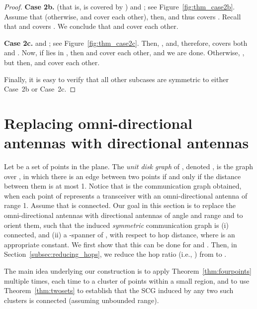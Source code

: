 \documentclass[11pt,letter]{article}
\newcommand{\old}[1]{{{}}}
\begin{document}
\begin{proof}
\noindent
{\bf Case 2b.}  (that is,  is covered by )
and ; see Figure~\ref{fig:thm_case2b}.
Assume that  (otherwise,  and  cover each other),
then,  and thus covers .
Recall that  and covers .
We conclude that  and  cover each other.


\old{
\begin{figure}[htp]
   \centering
       \texttt{[image: fig/thm\_figure8]}
   \caption{Proof of Theorem~\ref{thm:twosets} --- Case 2c.}
   \label{fig:thm_case2c}
\end{figure}
}

\noindent
{\bf Case 2c.}  and ; see Figure~\ref{fig:thm_case2c}.
Then, , and, therefore,  covers both  and .
Now, if  lies in , then  and  cover each other, and we are done.
Otherwise, , but then,  and  cover each other.

Finally, it is easy to verify that all other subcases are symmetric to either Case~2b or Case~2c.

\end{proof}



\section{Replacing omni-directional antennas with directional antennas}\label{sec:replacing_omni}

Let  be a set of  points in the plane. The {\em unit disk graph} of , denoted , is the graph over , in which there is an edge between two points if and only if the distance between them is at most 1. Notice that  is the communication graph obtained, when each point of  represents a transceiver with an omni-directional antenna of range 1. Assume that  is connected.
Our goal in this section is to replace the omni-directional antennas with directional antennas of angle  and range  and to orient them, such that the induced {\em symmetric} communication graph is (i) connected, and (ii) a -spanner of , with respect to hop distance, where  is an appropriate constant. We first show that this can be done for  and .
Then, in Section~\ref{subsec:reducing_hops}, we reduce the hop ratio (i.e., ) from  to .

The main idea underlying our construction is to apply Theorem~\ref{thm:fourpoints} multiple times, each time to a cluster of points within a small region, and to use Theorem~\ref{thm:twosets} to establish that the SCG induced by any two such clusters is connected (assuming unbounded range).
\end{document}
